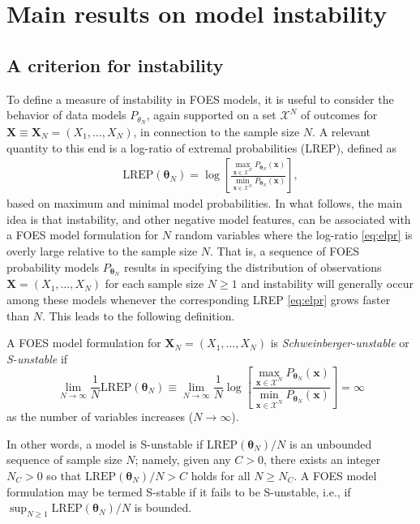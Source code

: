\documentclass[12pt]{article}
\theoremstyle{definition}
\newcommand{\REP}{\mathrm{LREP}}
\let\BeginKnitrBlock\begin \let\EndKnitrBlock\end
\begin{document}
\section{Main results on model instability}\label{instability-results}

\subsection{A criterion for instability}\label{criterion}

To define a measure of instability in FOES models, it is useful to
consider the behavior of data models \(P_{\theta_N}\), again supported
on a set \(\mathcal{X}^N\) of outcomes for
\(\boldsymbol X\equiv \boldsymbol X_N =(X_1,\ldots,X_N)\), in connection
to the sample size \(N\). A relevant quantity to this end is a log-ratio
of extremal probabilities (LREP), defined as
\begin{align}
\label{eq:elpr}
 \REP (\boldsymbol \theta_N)  =  \log \left[\frac{\max\limits_{  \boldsymbol x\in \mathcal{X}^N}P_{\boldsymbol \theta_N}( \boldsymbol x)}{\min\limits_{ \boldsymbol x \in \mathcal{X}^N}P_{\boldsymbol \theta_N}( \boldsymbol x)}\right],
\end{align}
based on maximum and minimal model probabilities. In what follows, the
main idea is that instability, and other negative model features, can be
associated with a FOES model formulation for \(N\) random variables
where the log-ratio \eqref{eq:elpr} is overly large relative to the sample
size \(N\). That is, a sequence of FOES probability models
\(P_{\boldsymbol \theta_N}\) results in specifying the distribution of
observations \(\boldsymbol X=(X_1,\ldots,X_N)\) for each sample size
\(N \geq 1\) and instability will generally occur among these models
whenever the corresponding LREP \eqref{eq:elpr} grows faster than \(N\).
This leads to the following definition.

\BeginKnitrBlock{definition}[S-unstable FOES model]
\protect\hypertarget{def:instabFSFS}{}{\label{def:instabFSFS}
\iffalse (S-unstable FOES model) \fi{} }A FOES model formulation for
\(\boldsymbol X_N=(X_1,\ldots,X_N)\) is \emph{Schweinberger-unstable} or
\emph{S-unstable} if
\begin{equation}
\label{eq:Sun}
\lim \limits_{N \rightarrow \infty} \frac{1}{N} \REP(\boldsymbol \theta_N) \equiv \lim \limits_{N \rightarrow \infty} \frac{1}{N}\log \left[\frac{\max\limits_{  \boldsymbol x\in \mathcal{X}^N}P_{\boldsymbol \theta_N}( \boldsymbol x)}{\min\limits_{ \boldsymbol x \in \mathcal{X}^N}P_{\boldsymbol \theta_N}( \boldsymbol x)}\right] = \infty
\end{equation}
as the number of variables increases (\(N \rightarrow \infty\)).
\EndKnitrBlock{definition} In other words, a model is S-unstable if
\(\REP(\boldsymbol \theta_N)/N\) is an unbounded sequence of sample size
\(N\); namely, given any \(C > 0\), there exists an integer \(N_C > 0\)
so that \(\REP(\boldsymbol \theta_N)/N > C\) holds for all
\(N \ge N_C\). A FOES model formulation may be termed S-stable if it
fails to be S-unstable, i.e., if
\(\sup_{N \geq 1}\REP(\boldsymbol \theta_N)/N\) is bounded.
\end{document}
